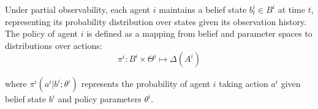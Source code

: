 \begin{definition}
    Under partial observability, each agent $i$ maintains a belief state $b_t^i \in B^i$ at time $t$, representing its probability distribution over states given its observation history. The policy of agent $i$ is defined as a mapping from belief and parameter spaces to distributions over actions:
    \begin{equation}
        \pi^i: B^i \times \Theta^i \mapsto \Delta(A^i)
    \end{equation}

    where $\pi^i(a^i|b^i; \theta^i)$ represents the probability of agent $i$ taking action $a^i$ given belief state $b^i$ and policy parameters $\theta^i$.
\end{definition}

